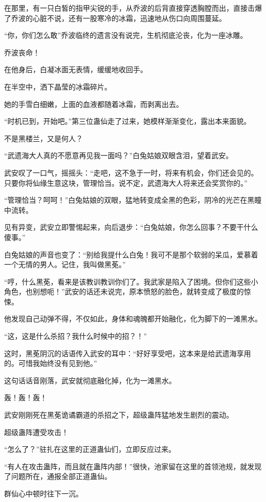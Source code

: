 \begin{this_body}
在那里，有一只白皙的指甲尖锐的手，从乔波的后背直接穿透胸膛而出，直接击爆了乔波的心脏不说，还有一股寒冷的冰霜，迅速地从伤口向周围蔓延。

“你，你们怎么敢”乔波临终的遗言没有说完，生机彻底沦丧，化为一座冰雕。

乔波丧命！

在他身后，白凝冰面无表情，缓缓地收回手。

在半空中，洒下晶莹的冰霜碎片。

她的手雪白细嫩，上面的血液都随着冰霜，而剥离出去。

“时机已到，开始吧。”第三位蛊仙走了过来，她模样渐渐变化，露出本来面貌。

不是黑楼兰，又是何人？

“武遗海大人真的不愿意再见我一面吗？”白兔姑娘双眼含泪，望着武安。

武安叹了一口气，摇摇头：“走吧，这不急于一时，将来有机会，你们还会见的。只要你将仙缘生意这块，管理恰当。说不定，武遗海大人将来还会奖赏你的。”

“管理恰当？呵呵！”白兔姑娘的双眼，猛地转变成全黑的色彩，阴冷的光芒在黑瞳中流转。

见有异变，武安立即警惕起来，向后退步：“白兔姑娘，你怎么回事？不要干什么傻事。”

白兔姑娘的声音也变了：“别给我提什么白兔！我可不是那个软弱的呆瓜，爱慕着一个无情的男人。记住，我叫做黑莬。”

“哼，什么黑莬，看来是该教训教训你们了。我武家是陷入了困境。但你们这些小角色，也别想呃！”武安的话还未说完，原本愤怒的脸色，就转变成了极度的惊悚。

他发现自己动弹不得，不仅如此，身体和魂魄都开始融化，化为脚下的一滩黑水。

“这，这是什么杀招？我什么时候中的招？！”

这时，黑莬阴沉的话语传入武安的耳中：“好好享受吧，这本来是给武遗海享用的。可惜我始终没有见到他。”

这句话话音刚落，武安就彻底融化掉，化为一滩黑水。

轰！轰！轰！

武安刚刚死在黑莬诡谲霸道的杀招之下，超级蛊阵猛地发生剧烈的震动。

超级蛊阵遭受攻击！

“怎么了？”驻扎在这里的正道蛊仙们，立即反应过来。

“有人在攻击蛊阵，而且就在蛊阵内部！”很快，池家留在这里的首领池规，就发现了问题所在，通报全部正道蛊仙。

群仙心中顿时往下一沉。


\end{this_body}
